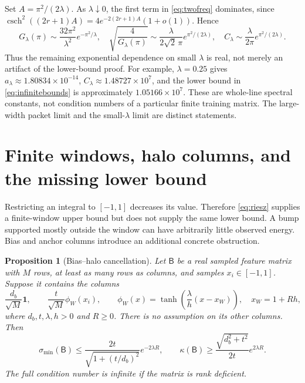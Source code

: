 \documentclass[11pt]{article}
\newtheorem{proposition}[theorem]{Proposition}
\theoremstyle{remark}
\newcommand{\csch}{\operatorname{csch}}
\begin{document}
Set $A=\pi^2/(2\lambda)$.  As $\lambda\downarrow0$, the first term in
\eqref{eq:twofreq} dominates, since
$\csch^2((2r+1)A)=4e^{-2(2r+1)A}(1+o(1))$.  Hence
\begin{equation}\label{eq:smalllambda}
 G_\lambda(\pi)\sim\frac{32\pi^2}{\lambda^2}e^{-\pi^2/\lambda},
 \quad
 \sqrt{\frac4{G_\lambda(\pi)}}
 \sim\frac{\lambda}{2\sqrt2\,\pi}e^{\pi^2/(2\lambda)},
 \quad
 C_\lambda\sim\frac{\lambda}{2\pi}e^{\pi^2/(2\lambda)}.
\end{equation}
Thus the remaining exponential dependence on small $\lambda$ is real,
not merely an artifact of the lower-bound proof.  For example,
$\lambda=0.25$ gives $a_\lambda\approx1.80834\times10^{-14}$,
$C_\lambda\approx1.48727\times10^7$, and the lower bound in
\eqref{eq:infinitebounds} is approximately $1.05166\times10^7$.
These are whole-line spectral constants, not condition numbers of a
particular finite training matrix.  The large-width packet limit and
the small-$\lambda$ limit are distinct statements.

\section{Finite windows, halo columns, and the missing lower bound}

Restricting an integral to $[-1,1]$ decreases its value.  Therefore
\eqref{eq:riesz} supplies a finite-window upper bound but does not
supply the same lower bound.  A bump supported mostly outside the
window can have arbitrarily little observed energy.  Bias and anchor
columns introduce an additional concrete obstruction.

\begin{proposition}[Bias--halo cancellation]\label{prop:halo}
Let $\mathsf B$ be a real sampled feature matrix with $M$ rows, at
least as many rows as columns, and samples $x_i\in[-1,1]$.  Suppose it
contains the columns
\[
 \frac{d_b}{\sqrt M}\mathbf1,
 \qquad \frac{t}{\sqrt M}\phi_W(x_i),
 \qquad
 \phi_W(x)=\tanh\!\left(\frac\lambda h(x-x_W)\right),
 \quad x_W=1+Rh,
\]
where $d_b,t,\lambda,h>0$ and $R\ge0$.  There is no assumption on its
other columns.  Then
\begin{equation}\label{eq:halo}
 \sigma_{\min}(\mathsf B)
 \le\frac{2t}{\sqrt{1+(t/d_b)^2}}e^{-2\lambda R},
 \qquad
 \kappa(\mathsf B)
 \ge\frac{\sqrt{d_b^2+t^2}}{2t}e^{2\lambda R}.
\end{equation}
The full condition number is infinite if the matrix is rank deficient.
\end{proposition}
\end{document}
